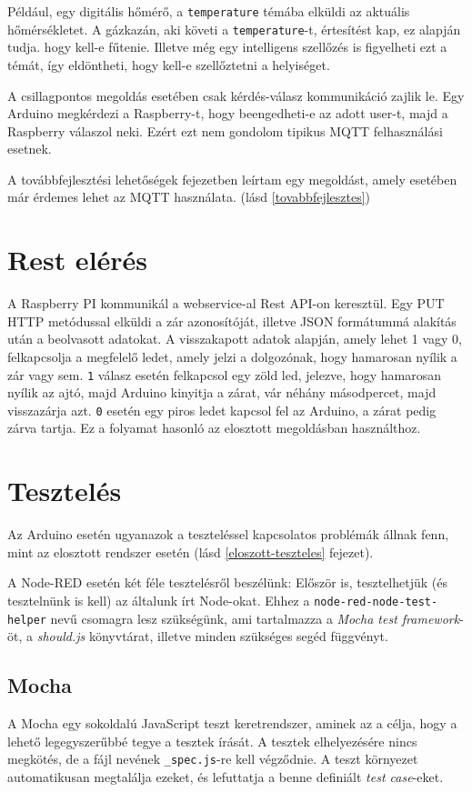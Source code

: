 \documentclass[
]{thesis-ekf}
\theoremstyle{definition}
\theoremstyle{remark}
\begin{document}
Például, egy digitális hőmérő, a \texttt{temperature} témába elküldi az aktuális hőmérsékletet. A gázkazán, aki követi a \texttt{temperature}-t, értesítést kap, ez alapján tudja. hogy kell-e fűtenie. Illetve még egy intelligens szellőzés is figyelheti ezt a témát, így eldöntheti, hogy kell-e szellőztetni a helyiséget.

A csillagpontos megoldás esetében csak kérdés-válasz kommunikáció zajlik le. Egy Arduino megkérdezi a Raspberry-t, hogy beengedheti-e az adott user-t, majd a Raspberry válaszol neki. Ezért ezt nem gondolom tipikus MQTT felhasználási esetnek.

A továbbfejlesztési lehetőségek fejezetben leírtam egy megoldást, amely esetében már érdemes lehet az MQTT használata. (lásd \ref{tovabbfejlesztes})

\section{Rest elérés}
A Raspberry PI kommunikál a webservice-al Rest API-on keresztül. Egy PUT HTTP metódussal elküldi a zár azonosítóját, illetve JSON formátummá alakítás után a beolvasott adatokat. A visszakapott adatok alapján, amely lehet 1 vagy 0, felkapcsolja a megfelelő ledet, amely jelzi a dolgozónak, hogy hamarosan nyílik a zár vagy sem. \texttt{1} válasz esetén felkapcsol egy zöld led, jelezve, hogy hamarosan nyílik az ajtó, majd Arduino kinyitja a zárat, vár néhány másodpercet, majd visszazárja azt. \texttt{0} esetén egy piros ledet kapcsol fel az Arduino, a zárat pedig zárva tartja. Ez a folyamat hasonló az elosztott megoldásban használthoz.

\section{Tesztelés}
Az Arduino esetén ugyanazok a teszteléssel kapcsolatos problémák állnak fenn, mint az elosztott rendszer esetén (lásd \ref{eloszott-teszteles} fejezet).

A Node-RED esetén két féle tesztelésről beszélünk: Először is, tesztelhetjük (és tesztelnünk is kell) az általunk írt Node-okat. Ehhez a \texttt{node-red-node-test-helper} nevű csomagra lesz szükségünk, ami tartalmazza a \emph{Mocha test framework}-öt, a \emph{should.js} könyvtárat, illetve minden szükséges segéd függvényt.

\subsection{Mocha}
A Mocha egy sokoldalú JavaScript teszt keretrendszer, aminek az a célja, hogy a lehető legegyszerűbbé tegye a tesztek írását. A tesztek elhelyezésére nincs megkötés, de a fájl nevének \texttt{\_spec.js}-re kell végződnie. A teszt környezet automatikusan megtalálja ezeket, és lefuttatja a benne definiált \emph{test case}-eket. \cite{mocha}
\end{document}
